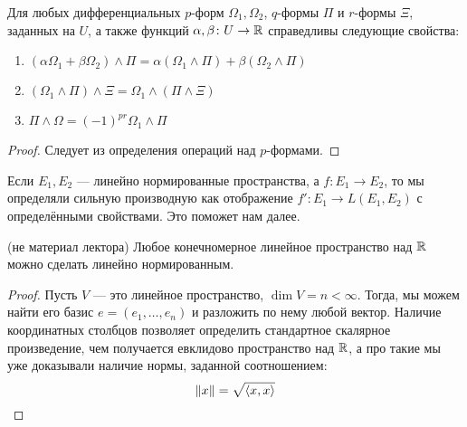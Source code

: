 \begin{proposition}
	Для любых дифференциальных $p$-форм $\Omega_1, \Omega_2$, $q$-формы $\Pi$ и $r$-формы $\Xi$, заданных на $U$, а также функций $\alpha, \beta \colon U \to \mathbb{R}$ справедливы следующие свойства:
	\begin{enumerate}
		\item $(\alpha \Omega_1 + \beta \Omega_2) \wedge \Pi = \alpha(\Omega_1 \wedge \Pi) + \beta (\Omega_2 \wedge \Pi)$
		
		\item $(\Omega_1 \wedge \Pi) \wedge \Xi = \Omega_1 \wedge (\Pi \wedge \Xi)$
		
		\item $\Pi \wedge \Omega = (-1)^{pr} \Omega_1 \wedge \Pi$
	\end{enumerate}
\end{proposition}

\begin{proof}
	Следует из определения операций над $p$-формами.
\end{proof}

\begin{reminder}
	Если $E_1, E_2$ --- линейно нормированные пространства, а $f \colon E_1 \to E_2$, то мы определяли сильную производную как отображение $f' \colon E_1 \to L(E_1, E_2)$ с определёнными свойствами. Это поможет нам далее.
\end{reminder}

\begin{proposition} (не материал лектора)
	Любое конечномерное линейное пространство над $\mathbb{R}$ можно сделать линейно нормированным.
\end{proposition}

\begin{proof}
	Пусть $V$ --- это линейное пространство, $\dim V = n < \infty$. Тогда, мы можем найти его базис $e = (e_1, \ldots, e_n)$ и разложить по нему любой вектор. Наличие координатных столбцов позволяет определить стандартное скалярное произведение, чем получается евклидово пространство над $\mathbb{R}$, а про такие мы уже доказывали наличие нормы, заданной соотношением:
	\[
		\|x\| = \sqrt{\left\langle x, x\right\rangle}
	\]
\end{proof}

